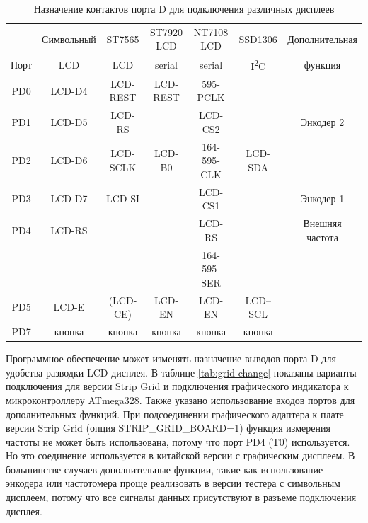 \begin{table}[H]
  \begin{center}
    \begin{tabular}{| c || c | c | c | c | c | c |}
    \hline
           & Символьный    & ST7565     & ST7920 LCD     & NT7108 LCD  & SSD1306     & Дополнительная \\
     Порт  & LCD           &   LCD      & serial         & serial      & I\textsuperscript{2}C  & функция \\
    \hline
    \hline
    PD0    &  LCD-D4       &  LCD-REST  & LCD-REST       & 595-PCLK        &            & \\
    \hline
    PD1    &  LCD-D5       &  LCD-RS    &                & LCD-CS2     &             & Энкодер 2 \\
    \hline
    PD2    &  LCD-D6       &  LCD-SCLK  & LCD-B0         & 164-595-CLK &  LCD-SDA    & \\
    \hline
    PD3    &  LCD-D7       &  LCD-SI    &                & LCD-CS1     &             & Энкодер 1 \\
    \hline
    PD4    &  LCD-RS       &            &                & LCD-RS      &             & Внешняя частота \\
           &               &            &                & 164-595-SER &             &                \\
    \hline
    PD5    &  LCD-E        &  (LCD-CE)  & LCD-EN         & LCD-EN      &   LCD--SCL  & \\
    \hline
    PD7    &  кнопка       & кнопка     & кнопка         & кнопка      & кнопка      & \\
    \hline
    \end{tabular}
  \end{center}
  \caption{Назначение контактов порта D для подключения различных дисплеев}
  \label{tab:display-con}
\end{table}

Программное обеспечение может изменять назначение выводов порта D для удобства разводки LCD-дисплея. 
В таблице \ref{tab:grid-change} показаны варианты подключения для версии Strip Grid и подключения графического 
индикатора к микроконтроллеру ATmega328.
Также указано использование входов портов для дополнительных функций.
При подсоединении графического адаптера к плате версии Strip Grid (опция STRIP\_GRID\_BOARD=1)
функция измерения частоты не может быть использована, потому что порт PD4 (T0) используется.
Но это соединение используется в китайской версии с графическим дисплеем.
В большинстве случаев дополнительные функции, такие как использование энкодера или частотомера проще 
реализовать в версии тестера с символьным дисплеем, потому что все сигналы данных присутствуют в разъеме
подключения дисплея.


